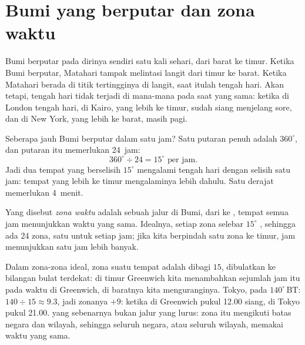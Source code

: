 \section{Bumi yang berputar dan zona waktu}

Bumi berputar pada dirinya sendiri satu kali sehari, dari barat ke timur.
Ketika Bumi berputar, Matahari tampak melintasi langit dari timur ke barat.
Ketika Matahari berada di titik tertingginya di langit, saat itulah tengah
hari. Akan tetapi, tengah hari tidak terjadi di mana-mana pada saat yang
sama: ketika di London tengah hari, di Kairo, yang lebih ke timur, sudah
siang menjelang sore, dan di New York, yang lebih ke barat, masih pagi.

Seberapa jauh Bumi berputar dalam satu jam? Satu putaran penuh adalah
$360^\circ$, dan putaran itu memerlukan 24~jam:
\[
360^\circ \div 24 = 15^\circ \text{ per jam.}
\]
Jadi dua tempat yang  berselisih $15^\circ$ mengalami tengah hari
dengan selisih satu jam: tempat yang lebih ke timur mengalaminya lebih
dahulu. Satu derajat memerlukan 4~menit.

\begin{definition}\label{def:g6:latitude-longitude:time-zone}
Yang disebut \emph{zona waktu} adalah sebuah jalur di
Bumi, dari  ke , tempat semua jam menunjukkan waktu yang sama.
Idealnya, setiap zona selebar $15^\circ$ , sehingga ada 24 zona, satu
untuk setiap jam; jika kita berpindah satu zona ke timur, jam menunjukkan
satu jam lebih banyak.
\end{definition}

Dalam zona-zona ideal, zona suatu tempat adalah  dibagi $15$,
dibulatkan ke bilangan bulat terdekat: di timur Greenwich kita menambahkan
sejumlah jam itu pada waktu di Greenwich, di baratnya kita menguranginya.
Tokyo, pada $140^\circ$\,BT: $140 \div 15 \approx 9.3$, jadi zonanya $+9$:
ketika di Greenwich pukul 12.00 siang, di Tokyo pukul 21.00.  yang
sebenarnya bukan jalur yang lurus: zona itu mengikuti batas negara dan
wilayah, sehingga seluruh negara, atau seluruh wilayah, memakai waktu yang
sama.

